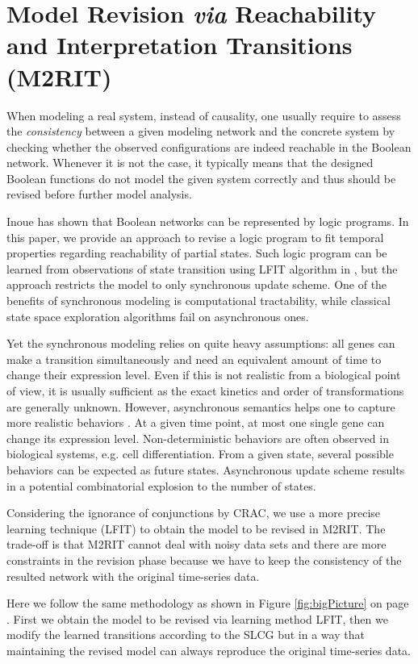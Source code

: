 \section{Model Revision \textit{via} Reachability and Interpretation Transitions (M2RIT)}
When modeling a real system, instead of causality, one usually require to assess the \textit{consistency} between a given modeling network and the concrete system by checking whether the observed configurations are indeed reachable in the Boolean network.
Whenever it is not the case, it typically means that the designed Boolean functions do not model the given system correctly and thus should be revised before further model analysis.

Inoue \cite{inoue2011logic} has shown that Boolean networks can be represented by logic programs.
In this paper, we provide an approach to revise a logic program to fit temporal properties regarding reachability of partial states.
%
Such logic program can be learned from observations of state transition using LFIT algorithm in \cite{ribeiro2015learning}, but the approach restricts the model to only synchronous update scheme.
One of the benefits of synchronous modeling is computational tractability, while classical state space exploration algorithms fail on asynchronous ones.

Yet the synchronous modeling relies on quite heavy assumptions:
all genes can make a transition simultaneously and need an equivalent amount of time to change their expression level.
Even if this is not realistic from a biological point of view, it is usually sufficient as the exact kinetics and order of transformations are generally unknown.
However, asynchronous semantics helps one to capture more realistic behaviors \cite{bernot2009}.
At a given time point, at most one single gene can change its expression level.
Non-deterministic behaviors are often observed in biological systems, e.g. cell differentiation.
From a given state, several possible behaviors can be expected as future states.
Asynchronous update scheme results in a potential combinatorial explosion to the number of states.

Considering the ignorance of conjunctions by CRAC, we use a more precise learning technique (LFIT) to obtain the model to be revised in M2RIT.
The trade-off is that M2RIT cannot deal with noisy data sets and there are more constraints in the revision phase because we have to keep the consistency of the resulted network with the original time-series data.

Here we follow the same methodology as shown in Figure \ref{fig:bigPicture} on page \pageref{fig:bigPicture}.
First we obtain the model to be revised via learning method LFIT, then we modify the learned transitions according to the SLCG but in a way that maintaining the revised model can always reproduce the original time-series data.

